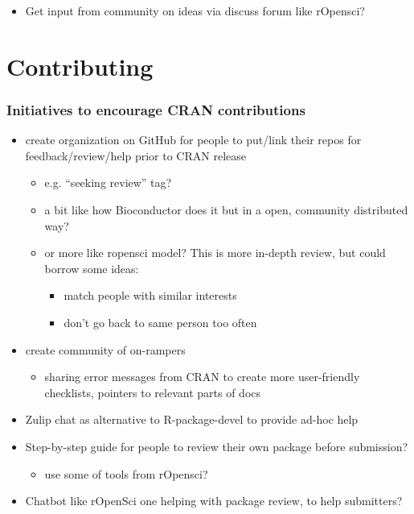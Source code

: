 \documentclass[]{book}
\providecommand{\tightlist}{%
  \setlength{\itemsep}{0pt}\setlength{\parskip}{0pt}}
\begin{document}
\begin{itemize}
\tightlist
\item
  Get input from community on ideas via discuss forum like rOpensci?
\end{itemize}

\hypertarget{contributing}{%
\chapter{Contributing}\label{contributing}}

\hypertarget{initiatives-to-encourage-cran-contributions}{%
\subsection{Initiatives to encourage CRAN contributions}\label{initiatives-to-encourage-cran-contributions}}

\begin{itemize}
\tightlist
\item
  create organization on GitHub for people to put/link their repos for feedback/review/help prior to CRAN release

  \begin{itemize}
  \tightlist
  \item
    e.g. ``seeking review'' tag?
  \item
    a bit like how Bioconductor does it but in a open, community distributed way?
  \item
    or more like ropensci model? This is more in-depth review, but could borrow some ideas:

    \begin{itemize}
    \tightlist
    \item
      match people with similar interests
    \item
      don't go back to same person too often
    \end{itemize}
  \end{itemize}
\item
  create community of on-rampers

  \begin{itemize}
  \tightlist
  \item
    sharing error messages from CRAN to create more user-friendly checklists, pointers to relevant parts of docs
  \end{itemize}
\item
  Zulip chat as alternative to R-package-devel to provide ad-hoc help
\item
  Step-by-step guide for people to review their own package before submission?

  \begin{itemize}
  \tightlist
  \item
    use some of tools from rOpensci?
  \end{itemize}
\item
  Chatbot like rOpenSci one helping with package review, to help submitters?
\end{itemize}


\end{document}
